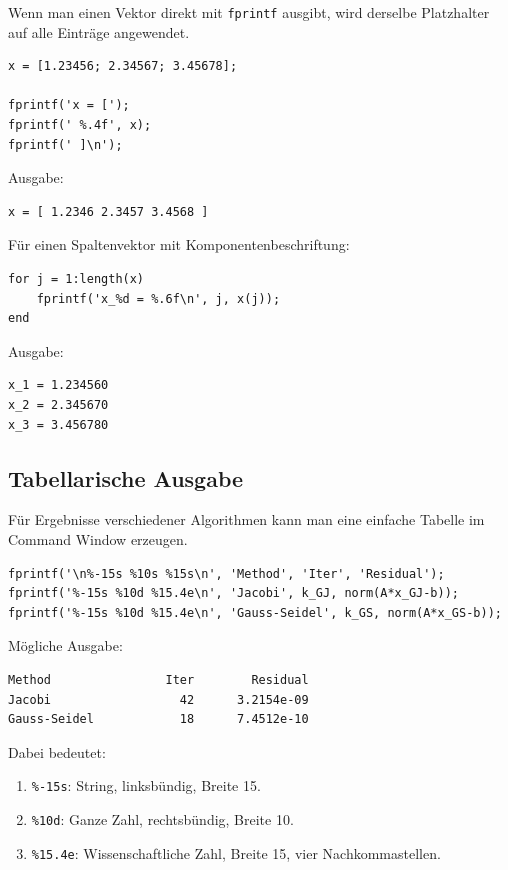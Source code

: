\documentclass[10pt, letterpaper]{article}
\begin{document}
Wenn man einen Vektor direkt mit \texttt{fprintf} ausgibt, wird derselbe Platzhalter auf alle Einträge angewendet.

\begin{verbatim}
x = [1.23456; 2.34567; 3.45678];

fprintf('x = [');
fprintf(' %.4f', x);
fprintf(' ]\n');
\end{verbatim}

Ausgabe:

\begin{verbatim}
x = [ 1.2346 2.3457 3.4568 ]
\end{verbatim}

Für einen Spaltenvektor mit Komponentenbeschriftung:

\begin{verbatim}
for j = 1:length(x)
    fprintf('x_%d = %.6f\n', j, x(j));
end
\end{verbatim}

Ausgabe:

\begin{verbatim}
x_1 = 1.234560
x_2 = 2.345670
x_3 = 3.456780
\end{verbatim}

\subsection{Tabellarische Ausgabe}

Für Ergebnisse verschiedener Algorithmen kann man eine einfache Tabelle im Command Window erzeugen.

\begin{verbatim}
fprintf('\n%-15s %10s %15s\n', 'Method', 'Iter', 'Residual');
fprintf('%-15s %10d %15.4e\n', 'Jacobi', k_GJ, norm(A*x_GJ-b));
fprintf('%-15s %10d %15.4e\n', 'Gauss-Seidel', k_GS, norm(A*x_GS-b));
\end{verbatim}

Mögliche Ausgabe:

\begin{verbatim}
Method                Iter        Residual
Jacobi                  42      3.2154e-09
Gauss-Seidel            18      7.4512e-10
\end{verbatim}

Dabei bedeutet:

\begin{enumerate}
    \item \texttt{\%-15s}: String, linksbündig, Breite 15.
    \item \texttt{\%10d}: Ganze Zahl, rechtsbündig, Breite 10.
    \item \texttt{\%15.4e}: Wissenschaftliche Zahl, Breite 15, vier Nachkommastellen.
\end{enumerate}
\end{document}
